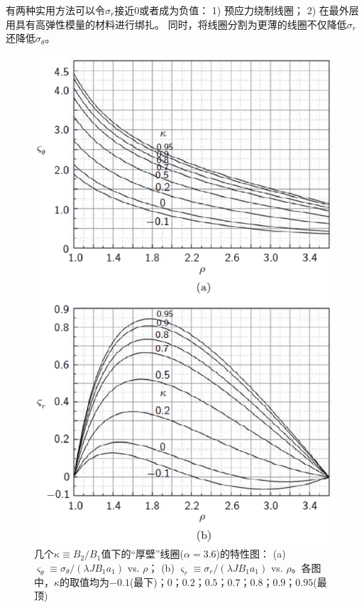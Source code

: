 有两种实用方法可以令$\sigma_{r}$接近0或者成为负值：
1) 预应力绕制线圈；
2) 在最外层用具有高弹性模量的材料进行绑扎。
同时，将线圈分割为更薄的线圈不仅降低$\sigma_{r}$还降低$\sigma_{\theta}$。
\begin{figure}
  \centering
 \includegraphics[scale=0.7]{chpt3/figs/fig3.12.eps}
  \caption{几个$\kappa\equiv B_2/B_1$值下的``厚壁''线圈($\alpha=3.6$)的特性图：
(a) $\varsigma_\theta\equiv \sigma_\theta/(\lambda J B_1 a_1)$ vs. $\rho$；
  (b) $\varsigma_r \equiv \sigma_r/(\lambda J B_1 a_1)$ vs. $\rho$。各图中，$\kappa$的取值均为$-0.1$(最下)；$0$；$0.2$；$0.5$；$0.7$；$0.8$；$0.9$；$0.95$(最顶) }
\end{figure}

